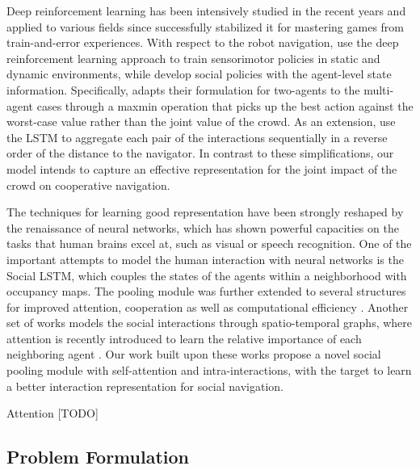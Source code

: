 \documentclass[letterpaper, 10 pt, conference]{ieeeconf}  %
\begin{document}
Deep reinforcement learning has been intensively studied in the recent years and applied to various fields since \cite{mnih_human-level_2015} successfully stabilized it for mastering games from train-and-error experiences. With respect to the robot navigation, \cite{tai_virtual--real_2017,long_towards_2017} use the deep reinforcement learning approach to train sensorimotor policies in static and dynamic environments, while \cite{chen_decentralized_2016,chen_socially_2017,everett_motion_2018} develop social policies with the agent-level state information. Specifically, \cite{chen_decentralized_2016} adapts their formulation for two-agents to the multi-agent cases through a maxmin operation that picks up the best action against the worst-case value rather than the joint value of the crowd. As an extension, \cite{everett_motion_2018} use the LSTM to aggregate each pair of the interactions sequentially in a reverse order of the distance to the navigator. In contrast to these simplifications, our model intends to capture an effective representation for the joint impact of the crowd on cooperative navigation. 

The techniques for learning good representation have been strongly reshaped by the renaissance of neural networks, which has shown powerful capacities on the tasks that human brains excel at, such as visual or speech recognition. One of the important attempts to model the human interaction with neural networks is the Social LSTM, which couples the states of the agents within a neighborhood with occupancy maps. The pooling module was further extended to several structures for improved attention, cooperation as well as computational efficiency \cite{fernando_soft_2017, gupta_social_2018}. Another set of works models the social interactions through spatio-temporal graphs, where attention is recently introduced to learn the relative importance of each neighboring agent \cite{vemula_social_2017}. Our work built upon these works propose a novel social pooling module with self-attention and intra-interactions, with the target to learn a better interaction representation for social navigation. 

Attention \cite{vaswani_attention_2017}
[TODO]

\subsection{Problem Formulation}
\end{document}
